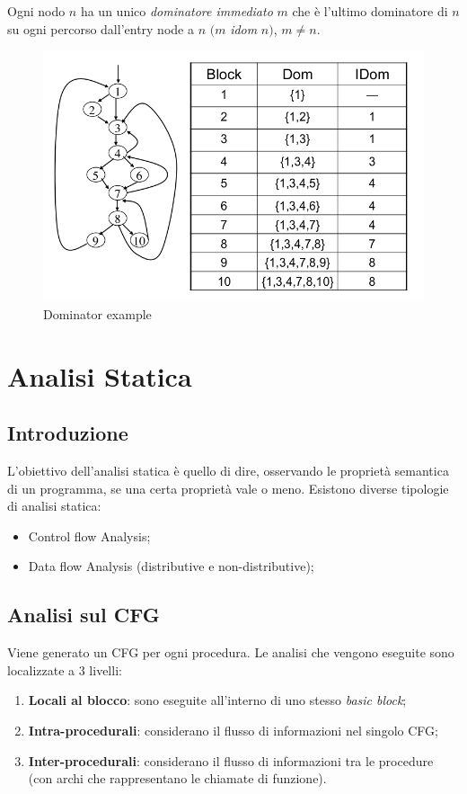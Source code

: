 \documentclass[a4paper, 10pt]{book}
\begin{document}
Ogni nodo $n$ ha un unico \textit{dominatore immediato} $m$ che è l'ultimo dominatore di $n$ su ogni percorso dall'entry node a $n$ $(m$ \textit{idom} $n)$, $m\neq n$.

\begin{figure}[H]
	\centering
	\includegraphics[scale=0.32]{pngs/DominatorExample}
	\caption{Dominator example}
\end{figure}



\chapter{Analisi Statica}

\section{Introduzione}
L'obiettivo dell'analisi statica è quello di dire, osservando le proprietà semantica di un programma, se una certa proprietà vale o meno. Esistono diverse tipologie di analisi statica: \begin{itemize}
	\item Control flow Analysis;
	\item Data flow Analysis (distributive e non-distributive);
\end{itemize}

\section{Analisi sul CFG}
Viene generato un CFG per ogni procedura. Le analisi che vengono eseguite sono localizzate a 3 livelli: \begin{enumerate}
	\item \textbf{Locali al blocco}: sono eseguite all'interno di uno stesso \textit{basic block};
	\item \textbf{Intra-procedurali}: considerano il flusso di informazioni nel singolo CFG;
	\item \textbf{Inter-procedurali}: considerano il flusso di informazioni tra le procedure (con archi che rappresentano le chiamate di funzione).
\end{enumerate}
\end{document}

